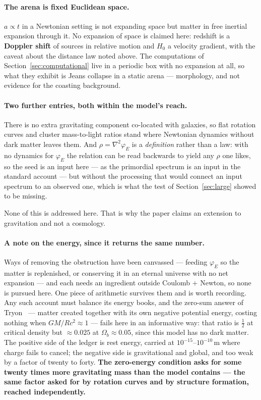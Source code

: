 \documentclass[11pt]{article}
\newcommand{\grad}{\nabla}
\begin{document}
\paragraph{The arena is fixed Euclidean space.} $a\propto t$ in a Newtonian setting is not expanding space but
matter in free inertial expansion through it. No expansion of space is claimed here: redshift is a
\textbf{Doppler shift} of sources in relative motion and $H_0$ a velocity gradient, with the caveat about the
distance law noted above. The computations of Section~\ref{sec:computational} live in a periodic box with no
expansion at all, so what they exhibit is Jeans collapse in a static arena --- morphology, and not evidence for
the coasting background.

\paragraph{Two further entries, both within the model's reach.} There is no extra gravitating component
co-located with galaxies, so flat rotation curves and cluster mass-to-light ratios stand where Newtonian dynamics
without dark matter leaves them. And $\rho=\grad^2\varphi_E$ is a \emph{definition} rather than a law: with no
dynamics for $\varphi_E$ the relation can be read backwards to yield any $\rho$ one likes, so the seed is an input
here --- as the primordial spectrum is an input in the standard account --- but without the processing that would
connect an input spectrum to an observed one, which is what the test of Section~\ref{sec:large} showed to be
missing.

\noindent None of this is addressed here. That is why the paper claims an extension to gravitation and not a
cosmology.

\paragraph{A note on the energy, since it returns the same number.} Ways of removing the obstruction have been
canvassed --- feeding $\varphi_E$ so the matter is replenished, or conserving it in an eternal universe with no
net expansion --- and each needs an ingredient outside Coulomb $+$ Newton, so none is pursued here. One piece of
arithmetic survives them and is worth recording. Any such account must balance its energy books, and the zero-sum
answer of Tryon~\cite{tryon} --- matter created together with its own negative potential energy, costing nothing
when $GM/Rc^2\approx1$ --- fails here in an informative way: that ratio is $\tfrac12$ at critical density but
${\approx}0.025$ at $\Omega_b\approx0.05$, since this model has no dark matter. The positive side of the ledger
is rest energy, carried at $10^{-15}$--$10^{-10}$\,m where charge fails to cancel; the negative side is
gravitational and global, and too weak by a factor of twenty to forty. \textbf{The zero-energy condition asks for
some twenty times more gravitating mass than the model contains --- the same factor asked for by rotation curves
and by structure formation, reached independently.}
\end{document}
